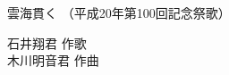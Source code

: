 \documentclass[10pt,b5j]{tarticle} %
\begin{document}
\begin{minipage}[c]{0.7\hsize} %
    \begin{center}
        {\LARGE
            雲海貫く %
        }
        {\small 
            （平成20年第100回記念祭歌） %
        }
    \end{center}
\end{minipage}
\begin{minipage}[c]{0.3\hsize} %
    \begin{flushright} %
        石井翔君 作歌\\木川明音君 作曲 %
    \end{flushright}
\end{minipage}
\end{document}
